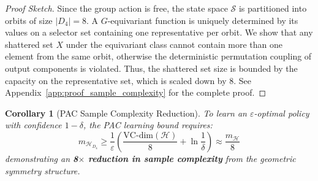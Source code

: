 \documentclass{article}
\newtheorem{corollary}[theorem]{Corollary}
\begin{document}
\begin{proof}[Proof Sketch]
Since the group action is free, the state space $\mathcal{S}$ is partitioned into orbits of size $|D_4| = 8$. A $G$-equivariant function is uniquely determined by its values on a selector set containing one representative per orbit. We show that any shattered set $X$ under the equivariant class cannot contain more than one element from the same orbit, otherwise the deterministic permutation coupling of output components is violated. Thus, the shattered set size is bounded by the capacity on the representative set, which is scaled down by 8. See Appendix~\ref{app:proof_sample_complexity} for the complete proof.
\end{proof}

\begin{corollary}[PAC Sample Complexity Reduction]
To learn an $\varepsilon$-optimal policy with confidence $1-\delta$, the PAC learning bound requires:
\begin{equation}
    m_{\mathcal{H}_{D_4}} \geq \frac{1}{\varepsilon}\!\left(\frac{\mathrm{VC}\text{-}\mathrm{dim}(\mathcal{H})}{8} + \ln\frac{1}{\delta}\right) \approx \frac{m_\mathcal{H}}{8}
\end{equation}
demonstrating an \textbf{8$\times$ reduction in sample complexity} from the geometric symmetry structure.
\end{corollary}
\end{document}
